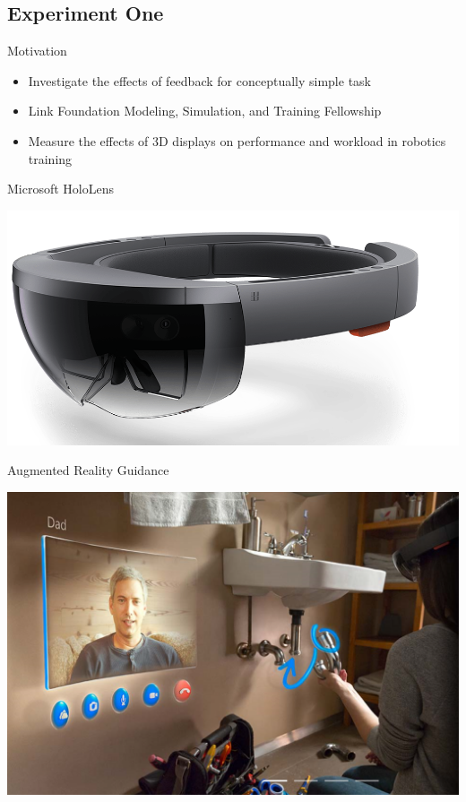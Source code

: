 \documentclass[10pt]{beamer}
\begin{document}
\subsection{Experiment One}

\begin{frame}[fragile]{Motivation}
  \begin{itemize}
    \setlength\itemsep{1em}
    \item Investigate the effects of feedback for conceptually simple task
    \item Link Foundation Modeling, Simulation, and Training Fellowship
    \item Measure the effects of 3D displays on performance and workload in robotics training
  \end{itemize}
\end{frame}

\begin{frame}[fragile]{Microsoft HoloLens}
  \begin{center}
    \includegraphics[width=\textwidth]{../img/Hololens.png}
  \end{center}
\end{frame}

\begin{frame}[fragile]{Augmented Reality Guidance}
  \begin{center}
    \includegraphics[width=\textwidth]{../img/sink.png}
  \end{center}
\end{frame}
\end{document}
